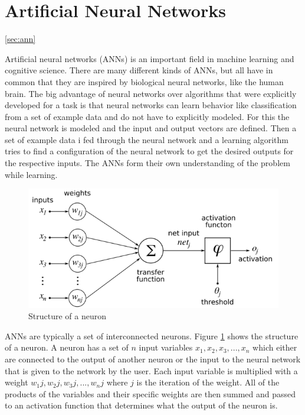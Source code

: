 \section{Artificial Neural Networks}
\ref{sec:ann}

Artificial neural networks (ANNs) is an important field in machine learning and cognitive science. There are many different kinds of ANNs, but all have in common that they are inspired by biological neural networks, like the human brain. The big advantage of neural networks over algorithms that were explicitly developed for a task is that neural networks can learn behavior like classification from a set of example data and do not have to explicitly modeled. For this the neural network is modeled and the input and output vectors are defined. Then a set of example data i fed through the neural network and a learning algorithm tries to find a configuration of the neural network to get the desired outputs for the respective inputs. The ANNs form their own understanding of the problem while learning.

\begin{figure}[ht]
	\centering
  \includegraphics[width=15cm]{figures/neuron_structure}
	\caption[Structure of a neuron]{Structure of a neuron \protect\footnotemark}
	\label{neuron}
\end{figure}

ANNs are typically a set of interconnected neurons. Figure \ref{neuron} shows the structure of a neuron. A neuron has a set of $n$ input variables $x_1, x_2, x_3, ..., x_n$ which either are connected to the output of another neuron or the input to the neural network that is given to the network by the user. Each input variable is multiplied with a weight $w_1j, w_2j, w_3j, ..., w_nj$ where $j$ is the iteration of the weight. All of the products of the variables and their specific weights are then summed and passed to an activation function that determines what the output of the neuron is.

